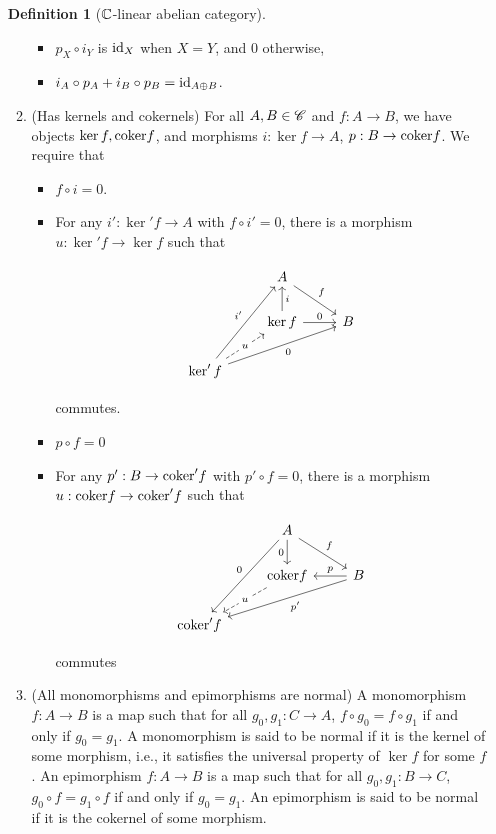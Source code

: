 \documentclass{article}
\theoremstyle{definition}
\newtheorem*{definition}{Definition}
\numberwithin{figure}{section}
\begin{document}
\begin{enumerate}[\thesection .1.]
\begin{definition}[$\mathbb{C}$-linear abelian category]
\begin{enumerate}
\begin{itemize}
\item $p_{X}\circ i_{Y}$ is $\mathrm{id}_X$ when $X=Y$, and $0$ otherwise,
\item $i_{A}\circ p_{A}+i_{B}\circ p_{B}=\mathrm{id}_{A\oplus B}$.
\end{itemize}
\item (Has kernels and cokernels) For all $A,B\in \mathscr{C}$ and $f:A\to B$, we have objects $\ker f, \mathrm{coker} f$, and morphisms $i:\ker f\to A$, $p: B\to \mathrm{coker} f$. We require that

\begin{itemize}
\item $f\circ i=0$.
\item For any $i': \ker' f\to A$ with $f\circ i'=0$, there is a morphism $u: \ker'f\to \ker f$ such that

\[\begin{tikzcd}
	& A \\
	& {\ker f} & B \\
	{\ker' f}
	\arrow["f", from=1-2, to=2-3]
	\arrow["{i'}", from=3-1, to=1-2]
	\arrow["0"', from=3-1, to=2-3]
	\arrow["i"', from=2-2, to=1-2]
	\arrow["0", from=2-2, to=2-3]
	\arrow["u"{description}, dashed, from=3-1, to=2-2]
\end{tikzcd}\]

commutes.

\item $p\circ f=0$
\item For any $p':B\to \mathrm{coker}' f$ with $p'\circ f=0$, there is a morphism $u: \mathrm{coker} f\to \mathrm{coker}' f$ such that

\[\begin{tikzcd}
	& A \\
	& {\coker f} & B \\
	{\coker' f}
	\arrow["f", from=1-2, to=2-3]
	\arrow["0"', from=1-2, to=3-1]
	\arrow["{p'}", from=2-3, to=3-1]
	\arrow["0"', from=1-2, to=2-2]
	\arrow["p"', from=2-3, to=2-2]
	\arrow["u"{description}, dashed, from=2-2, to=3-1]
\end{tikzcd}\]

commutes
\end{itemize}
\item (All monomorphisms and epimorphisms are normal) A monomorphism $f:A\to B$ is a map such that for all $g_0,g_1: C\to A$, $f\circ g_0=f\circ g_1$ if and only if $g_0=g_1$. A monomorphism is said to be normal if it is the kernel of some morphism, i.e., it satisfies the universal property of $\ker f$ for some $f$. An epimorphism $f:A\to B$ is a map such that for all $g_0,g_1:B\to C$, $g_0\circ f=g_1\circ f$ if and only if $g_0=g_1$. An epimorphism is said to be normal if it is the cokernel of some morphism.
\end{enumerate}
\raggedleft\qedsymbol{}
\end{definition}


\end{enumerate}
\end{document}
